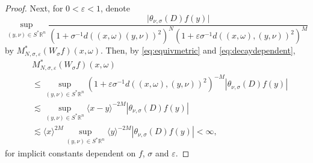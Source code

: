 \documentclass{amsart}
\newcommand {\veps}{\varepsilon}
\newcommand {\rb}{\rangle}
\newcommand {\lb}{\langle}
\newcommand {\Rn}{\mathbb{R}^{n}}
\newcommand {\Sp}{S^{*}\Rn}
\theoremstyle{definition}
\numberwithin{equation}{section}
\begin{document}
\begin{proof}
Next, for $0<\veps<1$, denote 
\[
\sup_{(y,\nu)\in\Sp}\frac{\big|\theta_{\nu,{\sigma}}(D)f(y)\big|}{(1+\sigma^{-1}d((x,\omega)(y,\nu))^{2})^{N}(1+\veps\sigma^{-1} d((x,\omega),(y,\nu))^{2})^{M}}
\]
by $M_{N,\sigma,\veps}^{*}(W_{\sigma}f)(x,\omega)$.
Then, by \eqref{eq:equivmetric} and \eqref{eq:decaydependent},
\begin{equation}\label{eq:Mepsfinite}
\begin{aligned}
&M_{N,\sigma,\veps}^{*}(W_{\sigma}f)(x,\omega)\\
&\leq\sup_{(y,\nu)\in\Sp}(1+\veps\sigma^{-1} d((x,\omega),(y,\nu))^{2})^{-M}|\theta_{\nu,\sigma}(D)f(y)|\\
&\lesssim \sup_{(y,\nu)\in\Sp}\lb x-y\rb^{-2M}|\theta_{\nu,\sigma}(D)f(y)|\\
&\lesssim\lb x\rb^{2M}\sup_{(y,\nu)\in\Sp}\lb y\rb^{-2M}|\theta_{\nu,{\sigma}}(D)f(y)|<\infty,
\end{aligned}
\end{equation}
for implicit constants dependent on $f$, $\sigma$ and $\veps$. 


\end{proof}
\end{document}
